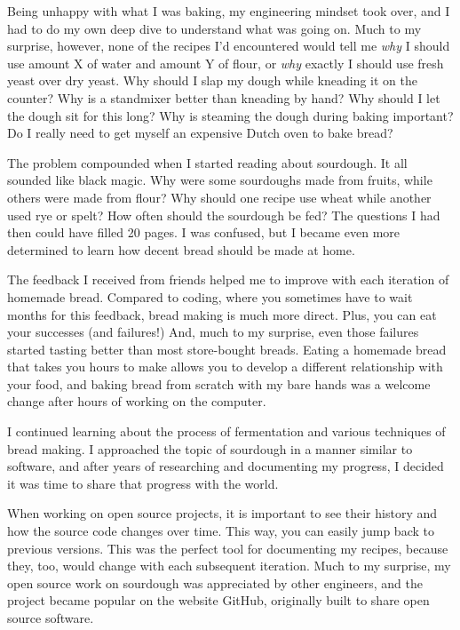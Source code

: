 Being unhappy with what I was baking, my engineering mindset took over, and I had
to do my own deep dive to understand what was going on. Much to my surprise, however,
none of the recipes I'd encountered would tell me {\it why} I should use amount X
of water and amount Y of flour, or {\it why} exactly I should use fresh yeast over dry yeast. Why
should I slap my dough while kneading it on the counter? Why is a standmixer
better than kneading by hand? Why should I let the dough sit for this long?
Why is steaming the dough during baking important? Do I really need to
get myself an expensive Dutch oven to bake bread?

The problem compounded when I started reading about sourdough. It all sounded like black
magic. Why were some sourdoughs made from fruits, while others were made from flour?
Why should one recipe use wheat while another used rye or spelt? How often should the
sourdough be fed? The questions I had then could have filled 20 pages. I was confused,
but I became even more determined to learn how decent bread should be made at home.

The feedback I received from friends helped me to improve with each
iteration of homemade bread. Compared to coding, where you sometimes have to wait months
for this feedback, bread making is much more direct. Plus, you can eat your successes
(and failures!) And, much to my surprise, even those failures started tasting better than
most store-bought breads. Eating a homemade bread that takes you hours to make allows you
to develop a different relationship with your food, and baking bread from scratch with my
bare hands was a welcome change after hours of working on the computer.

I continued learning about the process of fermentation and various techniques of bread making.
I approached the topic of sourdough in a manner similar to software, and after years of
researching and documenting my progress, I decided it was time to share that progress with the
world.

When working on open source projects, it is important to see their history and how the source
code changes over time. This way, you can easily jump back to previous versions. This was
the perfect tool for documenting my recipes, because they, too, would change with each
subsequent iteration. Much to my surprise, my open source work on sourdough was appreciated
by other engineers, and the project became popular on the website GitHub, originally built to
share open source software.

